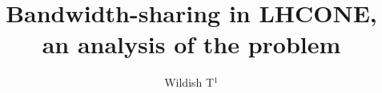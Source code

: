 \documentclass[a4paper]{jpconf}
\begin{document}
\title{Bandwidth-sharing in LHCONE, an analysis of the problem}

\author{Wildish T$^1$}

\address{$^1$ Princeton University, New Jersey, USA}










\par

\end{document}
